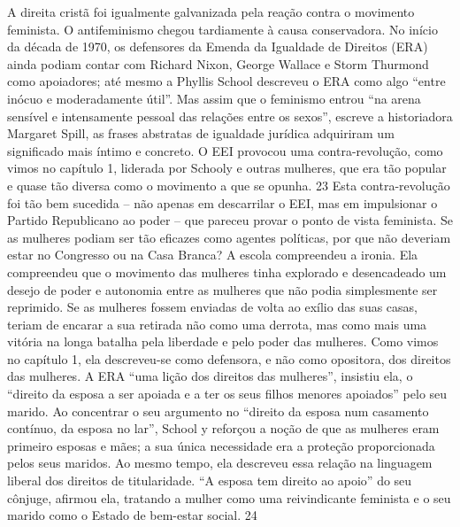 \par
 
A direita cristã foi igualmente galvanizada pela reação contra o movimento feminista. O antifeminismo chegou tardiamente à causa conservadora. No início da década de 1970, os defensores da Emenda da Igualdade de Direitos (ERA) ainda podiam contar com Richard Nixon, George Wallace e Storm Thurmond como apoiadores; até mesmo a Phyllis School descreveu o ERA como algo “entre inócuo e moderadamente útil”. Mas assim que o feminismo entrou “na arena sensível e intensamente pessoal das relações entre os sexos”, escreve a historiadora Margaret Spill, as frases abstratas de igualdade jurídica adquiriram um significado mais íntimo e concreto. O EEI provocou uma contra-revolução, como vimos no capítulo 1, liderada por Schooly e outras mulheres, que era tão popular e quase tão diversa como o movimento a que se opunha.
 {\color{blue} 23}  
Esta contra-revolução foi tão bem sucedida – não apenas em descarrilar o EEI, mas em impulsionar o Partido Republicano ao poder – que pareceu provar o ponto de vista feminista. Se as mulheres podiam ser tão eficazes como agentes políticas, por que não deveriam estar no Congresso ou na Casa Branca? A escola compreendeu a ironia. Ela compreendeu que o movimento das mulheres tinha explorado e desencadeado um desejo de poder e autonomia entre as mulheres que não podia simplesmente ser reprimido. Se as mulheres fossem enviadas de volta ao exílio das suas casas, teriam de encarar a sua retirada não como uma derrota, mas como mais uma vitória na longa batalha pela liberdade e pelo poder das mulheres. Como vimos no capítulo 1, ela descreveu-se como defensora, e não como opositora, dos direitos das mulheres. A ERA “uma lição dos direitos das mulheres”, insistiu ela, o “direito da esposa a ser apoiada e a ter os seus filhos menores apoiados” pelo seu marido. Ao concentrar o seu argumento no “direito da esposa num casamento contínuo, da esposa no lar”, School y reforçou a noção de que as mulheres eram primeiro esposas e mães; a sua única necessidade era a proteção proporcionada pelos seus maridos. Ao mesmo tempo, ela descreveu essa relação na linguagem liberal dos direitos de titularidade. “A esposa tem direito ao apoio” do seu cônjuge, afirmou ela, tratando a mulher como uma reivindicante feminista e o seu marido como o Estado de bem-estar social.
 {\color{blue} 24}  

 
\par
 

